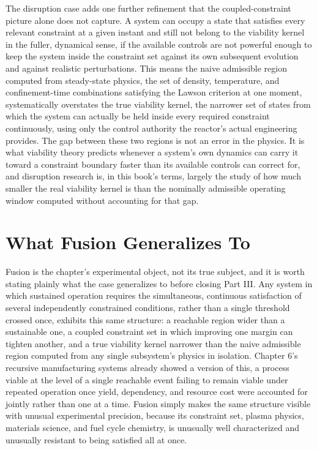 \documentclass[11pt]{book}
\begin{document}
The disruption case adds one further refinement that the coupled-constraint picture alone does not capture. A system can occupy a state that satisfies every relevant constraint at a given instant and still not belong to the viability kernel in the fuller, dynamical sense, if the available controls are not powerful enough to keep the system inside the constraint set against its own subsequent evolution and against realistic perturbations. This means the naive admissible region computed from steady-state physics, the set of density, temperature, and confinement-time combinations satisfying the Lawson criterion at one moment, systematically overstates the true viability kernel, the narrower set of states from which the system can actually be held inside every required constraint continuously, using only the control authority the reactor's actual engineering provides. The gap between these two regions is not an error in the physics. It is what viability theory predicts whenever a system's own dynamics can carry it toward a constraint boundary faster than its available controls can correct for, and disruption research is, in this book's terms, largely the study of how much smaller the real viability kernel is than the nominally admissible operating window computed without accounting for that gap.

\section{What Fusion Generalizes To}

Fusion is the chapter's experimental object, not its true subject, and it is worth stating plainly what the case generalizes to before closing Part III. Any system in which sustained operation requires the simultaneous, continuous satisfaction of several independently constrained conditions, rather than a single threshold crossed once, exhibits this same structure: a reachable region wider than a sustainable one, a coupled constraint set in which improving one margin can tighten another, and a true viability kernel narrower than the naive admissible region computed from any single subsystem's physics in isolation. Chapter 6's recursive manufacturing systems already showed a version of this, a process viable at the level of a single reachable event failing to remain viable under repeated operation once yield, dependency, and resource cost were accounted for jointly rather than one at a time. Fusion simply makes the same structure visible with unusual experimental precision, because its constraint set, plasma physics, materials science, and fuel cycle chemistry, is unusually well characterized and unusually resistant to being satisfied all at once.
\end{document}
